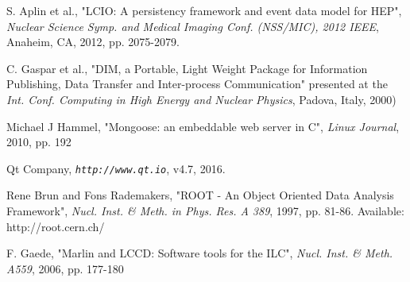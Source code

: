 \documentclass[conference]{IEEEtran}
\begin{document}
%
%
%

\begin{thebibliography}{1}

S. Aplin et al., "LCIO: A persistency framework and event data model for HEP", \emph{Nuclear Science Symp. and Medical Imaging Conf. (NSS/MIC), 2012 IEEE}, Anaheim, CA, 2012, pp. 2075-2079.

C. Gaspar et al., "DIM, a Portable, Light Weight Package for Information Publishing, Data Transfer and Inter-process Communication" presented at the \emph{Int. Conf. Computing in High Energy and Nuclear Physics}, Padova, Italy, 2000)

Michael J Hammel, "Mongoose: an embeddable web server in C", \emph{Linux Journal}, 2010, pp. 192

Qt Company, \emph{\tt http://www.qt.io}, v4.7, 2016.

Rene Brun and Fons Rademakers, "ROOT - An Object Oriented Data Analysis Framework", \emph{Nucl. Inst. \& Meth. in Phys. Res. A 389}, 1997, pp. 81-86. Available: http://root.cern.ch/

F. Gaede,  "Marlin and LCCD: Software tools for the ILC", \emph{Nucl. Inst. \& Meth. A559}, 2006, pp. 177-180

\end{thebibliography}


%
\end{document}
